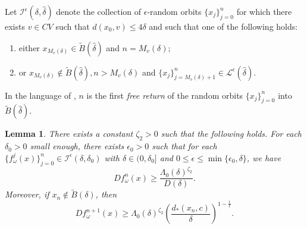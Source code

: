 \documentclass[11pt,oneside]{article}
\theoremstyle{plain}
\newtheorem{lem}{Lemma}[section]
\numberwithin{equation}{section}
\numberwithin{figure}{section}
\numberwithin{table}{section}
\begin{document}
Let $\mathcal I^{\epsilon}(\delta, \hat \delta)$ denote the collection of $\epsilon$-random orbits $\{x_j\}_{j=0}^n$ for which there exists $v \in CV$ such that $d(x_0, v) \leq 4 \delta$ and such that one of the following holds:

\begin{enumerate}
\item[(1)] either $x_{M_v(\delta)} \in \tilde B(\hat \delta)$ and $n = M_v(\delta)$;
 
\item[(2)] or $x_{M_v(\delta)} \notin \tilde B(\hat \delta), n >M_v(\delta)$ and $\{ x_j \}_{j=M_v(\delta)+1}^n \in \mathcal L^{\epsilon}(\hat \delta)$. 
\end{enumerate}
In the language of \cite{BC}, $n$ is the first {\it free return} of the random orbits $\{ x_j \}_{j=0}^n$ into $\tilde B(\hat \delta)$.


\begin{lem}
There exists a constant $\zeta_2>0$ such that the following holds. For each $\delta_0 > 0$ small enough, there exists $\epsilon_0>0$ such that for each $\{ f_{\omega}^j(x) \}_{j=0}^n \in \mathcal I^{\epsilon}(\delta, \delta_0)$ with $\delta \in (0, \delta_0]$ and $0 \leq \epsilon \leq \min \{ \epsilon_0, \delta\}$, we have
\begin{equation}
Df_{\omega}^n(x) \geq \frac{\Lambda_0(\delta)^{\zeta_2}}{D(\delta)}. 
\end{equation}
Moreover, if $x_n \notin \tilde B(\delta)$, then
\begin{equation}
Df_{\omega}^{n+1}(x) \geq \Lambda_0(\delta)^{\zeta_2} \left(\frac{d_*(x_n, c)}{\delta} \right)^{1 - \frac{1}{\ell}}. 
\end{equation}
\end{lem}
\end{document}
